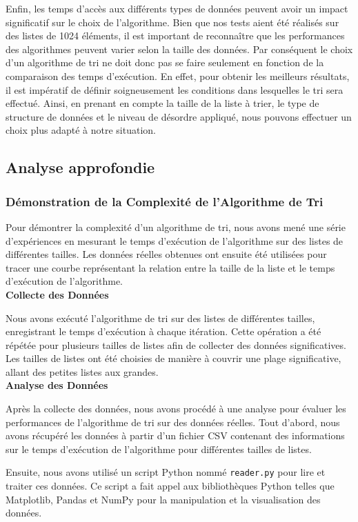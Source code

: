 \documentclass[a4paper,12pt]{article}
\begin{document}
    Enfin, les temps d'accès aux différents types de données peuvent avoir un impact significatif sur le choix de l'algorithme. Bien que nos tests aient été réalisés sur des listes de 1024 éléments, il est important de reconnaître que les performances des algorithmes peuvent varier selon la taille des données. Par conséquent le choix d'un algorithme de tri ne doit donc pas se faire seulement en fonction de la comparaison des temps d'exécution. En effet, pour obtenir les meilleurs résultats, il est impératif de définir soigneusement les conditions dans lesquelles le tri sera effectué. Ainsi, en prenant en compte la taille de la liste à trier, le type de structure de données et le niveau de désordre appliqué, nous pouvons effectuer un choix plus adapté à notre situation.
\subsection{Analyse approfondie}
\subsubsection{Démonstration de la Complexité de l'Algorithme de Tri}
Pour démontrer la complexité d'un algorithme de tri, nous avons mené une série d'expériences en mesurant le temps d'exécution de l'algorithme sur des listes de différentes tailles. Les données réelles obtenues ont ensuite été utilisées pour tracer une courbe représentant la relation entre la taille de la liste et le temps d'exécution de l'algorithme.\\

\textbf{Collecte des Données}

Nous avons exécuté l'algorithme de tri sur des listes de différentes tailles, enregistrant le temps d'exécution à chaque itération. Cette opération a été répétée pour plusieurs tailles de listes afin de collecter des données significatives. Les tailles de listes ont été choisies de manière à couvrir une plage significative, allant des petites listes aux grandes.\\

\textbf{Analyse des Données}

Après la collecte des données, nous avons procédé à une analyse pour évaluer les performances de l'algorithme de tri sur des données réelles. Tout d'abord, nous avons récupéré les données à partir d'un fichier CSV contenant des informations sur le temps d'exécution de l'algorithme pour différentes tailles de listes.

Ensuite, nous avons utilisé un script Python nommé \texttt{reader.py} pour lire et traiter ces données. Ce script a fait appel aux bibliothèques Python telles que Matplotlib, Pandas et NumPy pour la manipulation et la visualisation des données.
\end{document}
